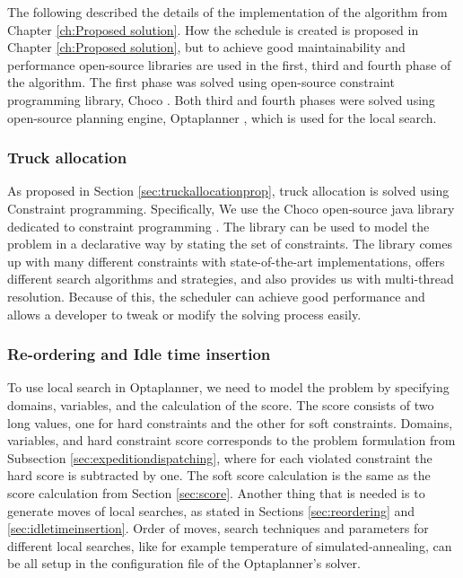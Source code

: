 \documentclass{ctuthesis}
\begin{document}
The following described the details of the implementation of the algorithm from Chapter \ref{ch:Proposed solution}. How the schedule is created is proposed in Chapter \ref{ch:Proposed solution}, but to achieve good maintainability and performance open-source libraries are used in the first, third and fourth phase of the algorithm. The first phase was solved using open-source constraint programming library, Choco \cite{choco}. Both third and fourth phases were solved using open-source planning engine, Optaplanner \cite{optaplanner}, which is used for the local search.

\subsubsection{Truck allocation}

As proposed in Section \ref{sec:truckallocationprop}, truck allocation is solved using Constraint programming. Specifically, We use the Choco open-source java library dedicated to constraint programming \cite{choco}. The library can be used to model the problem in a declarative way by stating the set of constraints. The library comes up with many different constraints with state-of-the-art implementations, offers different search algorithms and strategies, and also provides us with multi-thread resolution. Because of this, the scheduler can achieve good performance and allows a developer to tweak or modify the solving process easily. 

\subsubsection{Re-ordering and Idle time insertion}

To use local search in Optaplanner, we need to model the problem by specifying domains, variables, and the calculation of the score. The score consists of two long values, one for hard constraints and the other for soft constraints. Domains, variables, and hard constraint score corresponds to the problem formulation from Subsection \ref{sec:expeditiondispatching}, where for each violated constraint the hard score is subtracted by one. The soft score calculation is the same as the score calculation from Section \ref{sec:score}.
Another thing that is needed is to generate moves of local searches, as stated in Sections \ref{sec:reordering} and \ref{sec:idletimeinsertion}. Order of moves, search techniques and parameters for different local searches, like for example temperature of simulated-annealing, can be all setup in the configuration file of the Optaplanner's solver.
\end{document}
